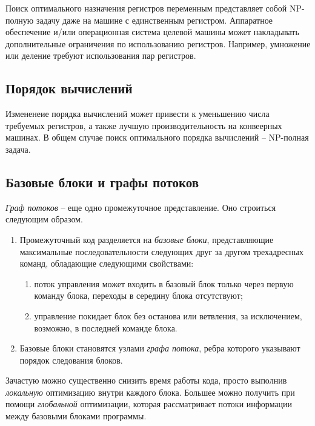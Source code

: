 \documentclass[a4paper,12pt]{article}
\begin{document}
Поиск оптимального назначения регистров переменным представляет собой NP-полную задачу даже на машине с единственным регистром. Аппаратное обеспечение и/или операционная система целевой машины может накладывать дополнительные ограничения по использованию регистров. Например, умножение или деление требуют использования пар регистров.

\subsection{Порядок вычислений}

Измененеие порядка вычислений может привести к уменьшению числа требуемых регистров, а также лучшую производительность на конвеерных машинах. В общем случае поиск оптимального порядка вычислений -- NP-полная задача.

\subsection{Базовые блоки и графы потоков}

\textit{Граф потоков} -- еще одно промежуточное представление. Оно строиться следующим образом.
\begin{enumerate}
\item Промежуточный код разделяется на \textit{базовые блоки}, представляющие максимальные последовательности следующих друг за другом трехадресных команд, обладающие следующими свойствами:
\begin{enumerate}
\item поток управления может входить в базовый блок только через первую команду блока, переходы в середину блока отсутствуют;
\item управление покидает блок без останова или ветвления, за исключением, возможно, в последней команде блока.
\end{enumerate}
\item Базовые блоки становятся узлами \textit{графа потока}, ребра которого указывают порядок следования блоков.
\end{enumerate}
Зачастую можно существенно снизить время работы кода, просто выполнив \textit{локальную} оптимизацию внутри каждого блока. Большее можно получить при помощи \textit{глобальной} оптимизации, которая рассматривает потоки информации между базовыми блоками программы.
\end{document}
